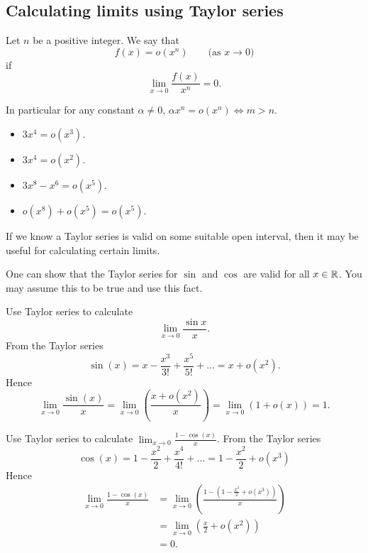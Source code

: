 \documentclass[10pt, a4paper]{article}
\begin{document}
\subsection{Calculating limits using Taylor series}
\begin{definition}
    Let $n$ be a positive integer.
    We say that
    \[
    f(x) = o(x ^ n)\qquad\text{(as $x \rightarrow 0$)}
    \]
    if
    \[
    \lim_{x \rightarrow 0}\frac{f(x)}{x ^ n} = 0.
    \]
\end{definition}
In particular for any constant $\alpha \neq 0$,
$\alpha x ^ n = o(x ^ n) \iff m > n$.
\begin{example}\phantom{}
    \begin{itemize}
        \item $3x ^ 4 = o(x ^ 3)$.
        \item $3x ^ 4 = o(x ^ 2)$.
        \item $3x ^ 8 - x ^ 6 = o(x ^ 5)$.
        \item $o(x ^ 8) + o(x ^ 5) = o(x ^ 5)$.
    \end{itemize}
\end{example}

If we know a Taylor series is valid on some suitable open interval,
then it may be useful for calculating certain limits.

One can show that the Taylor series for $\sin$ and $\cos$ are valid for all $x \in \mathbb{R}$.
You may assume this to be true and use this fact.
\begin{example}
    Use Taylor series to calculate
    \[
    \lim_{x \rightarrow 0}\frac{\sin{x}}{x}.
    \]
    From the Taylor series
    \[
    \sin(x) = x - \frac{x ^ 3}{3!} + \frac{x ^ 5}{5!} + \dotsc = x + o(x ^ 2).
    \]
    Hence
    \[
    \lim_{x \rightarrow 0}\frac{\sin(x)}{x} = \lim_{x \rightarrow 0}\left(\frac{x + o(x ^ 2)}{x}\right) = \lim_{x \rightarrow 0}(1 + o(x)) = 1.
    \]
\end{example}

\begin{example}
    Use Taylor series to calculate $\lim_{x \rightarrow 0}\frac{1 - \cos(x)}{x}$.
    From the Taylor series
    \[
    \cos(x) = 1 - \frac{x ^ 2}{2} + \frac{x ^ 4}{4!} + \dotsc = 1 - \frac{x ^ 2}{2} + o(x ^ 3)
    \]
    Hence
    \begin{align*}
    \lim_{x \rightarrow 0}\frac{1 - \cos(x)}{x} &= \lim_{x \rightarrow 0}\left(\frac{1 - \left(1 - \frac{x ^ 2}{2} + o(x ^ 3)\right)}{x}\right) \\
    &= \lim_{x \rightarrow 0}\left(\frac{x}{2} + o(x ^ 2)\right) \\
    &= 0.
    \end{align*}
\end{example}
\end{document}
